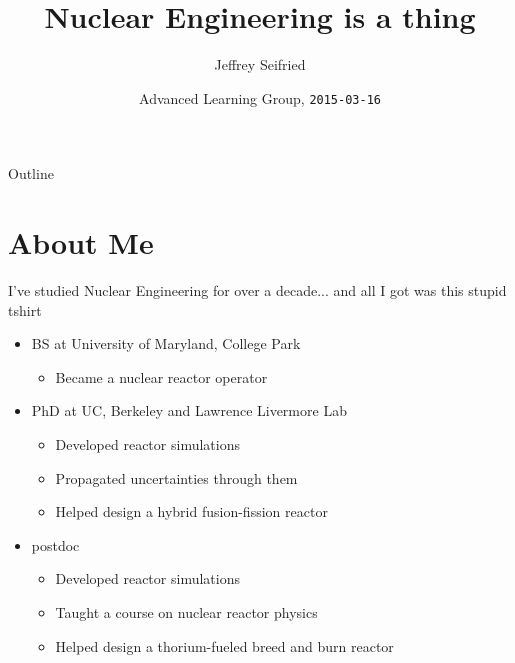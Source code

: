 \documentclass{beamer}
\title{Nuclear Engineering is a thing}
\author{Jeffrey Seifried}
\institute{Ad Delivery Team, Yelp}
\date{Advanced Learning Group, \texttt{2015-03-16}}
\begin{document}
\begin{frame}
  \titlepage
\end{frame}

\begin{frame}{Outline}
  \tableofcontents
\end{frame}


\section{About Me}

    \begin{frame}{I've studied Nuclear Engineering for over a decade}{... and all I got was this stupid tshirt}

        \begin{itemize}

            \item BS at University of Maryland, College Park
            \begin{itemize}
                \item Became a nuclear reactor operator
            \end{itemize}

            \pause

            \item PhD at UC, Berkeley and Lawrence Livermore Lab
            \begin{itemize}
                \item Developed reactor simulations
                \item Propagated uncertainties through them
                \item Helped design a hybrid fusion-fission reactor
            \end{itemize}

            \pause

            \item postdoc
            \begin{itemize}
                \item Developed reactor simulations
                \item Taught a course on nuclear reactor physics
                \item Helped design a thorium-fueled breed and burn reactor
            \end{itemize}
        \end{itemize}

    \end{frame}
\end{document}
